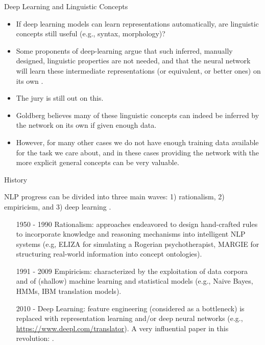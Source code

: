 \documentclass[handout]{beamer}
\begin{document}
\begin{frame}{Deep Learning and Linguistic Concepts}
\begin{scriptsize}
\begin{itemize}
\item If deep learning models can learn representations automatically, are linguistic concepts still useful (e.g., syntax, morphology)?
\item Some proponents of deep-learning argue that such inferred, manually designed, linguistic properties are not needed, and that the neural network will learn
these intermediate representations (or equivalent, or better ones) on its own \cite{goldberg2016primer}. 
\item The jury is still out on this.
\item Goldberg believes many of these linguistic concepts can indeed be inferred by the network on its own if given enough data.
\item However, for many other cases we do not have enough training data available for the task we care about, and in these cases providing the network with the more explicit general concepts can be very valuable.
\end{itemize}
\end{scriptsize}
\end{frame}


\begin{frame}{History}
\begin{scriptsize}
NLP progress can be divided into three main waves: 1) rationalism, 2) empiricism, and 3) deep learning \cite{deng2018deep}.
\begin{itemize}
\item [1950 - 1990] Rationalism: approaches endeavored to design hand-crafted rules to incorporate knowledge and reasoning mechanisms into intelligent NLP systems (e.g,  ELIZA for simulating a Rogerian psychotherapist, MARGIE for structuring real-world information into concept ontologies).
\item [1991 - 2009] Empiricism: characterized by the exploitation of data corpora and
of (shallow) machine learning and statistical models (e.g., Naive Bayes, HMMs, IBM translation models).
\item [2010 - ] Deep Learning: feature engineering (considered as a bottleneck) is replaced with representation learning and/or deep neural networks (e.g., \url{https://www.deepl.com/translator}). A very influential paper in this revolution: \cite{collobert2011natural}.
\end{itemize}

\end{scriptsize}
\end{frame}
\end{document}
